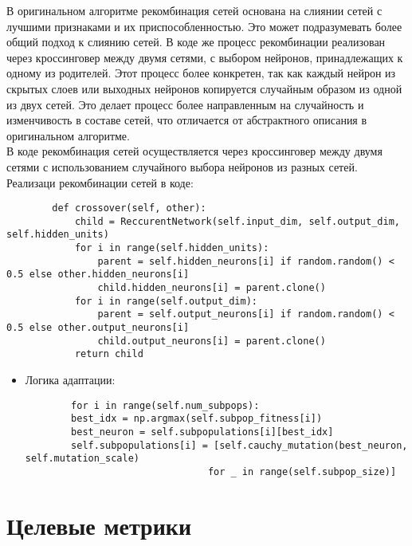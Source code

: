 \documentclass[a4paper,12pt]{article}
\begin{document}
В оригинальном алгоритме рекомбинация сетей основана на слиянии сетей с лучшими признаками и их приспособленностью. Это может подразумевать более общий подход к слиянию сетей. В коде же процесс рекомбинации реализован через кроссинговер между двумя сетями, с выбором нейронов, принадлежащих к одному из родителей. Этот процесс более конкретен, так как каждый нейрон из скрытых слоев или выходных нейронов копируется случайным образом из одной из двух сетей. Это делает процесс более направленным на случайность и изменчивость в составе сетей, что отличается от абстрактного описания в оригинальном алгоритме.~\\
В коде рекомбинация сетей осуществляется через кроссинговер между двумя сетями с использованием случайного выбора нейронов из разных сетей.~\\
Реализаци рекомбинации сетей в коде:
    \begin{itemize}
	\begin{lstlisting}
		def crossover(self, other):
            child = ReccurentNetwork(self.input_dim, self.output_dim, self.hidden_units)
            for i in range(self.hidden_units):
                parent = self.hidden_neurons[i] if random.random() < 0.5 else other.hidden_neurons[i]
                child.hidden_neurons[i] = parent.clone()
            for i in range(self.output_dim):
                parent = self.output_neurons[i] if random.random() < 0.5 else other.output_neurons[i]
                child.output_neurons[i] = parent.clone()
            return child

	\end{lstlisting}
\end{itemize}



\begin{itemize}
	\item[] Логика адаптации:
	\begin{lstlisting}
		for i in range(self.num_subpops):
        best_idx = np.argmax(self.subpop_fitness[i])
        best_neuron = self.subpopulations[i][best_idx]
        self.subpopulations[i] = [self.cauchy_mutation(best_neuron, self.mutation_scale) 
                                for _ in range(self.subpop_size)]
	\end{lstlisting}
\end{itemize}





\newpage
\section{Целевые метрики}
\end{document}
